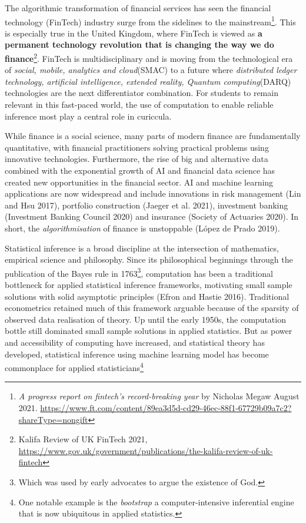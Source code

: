 \documentclass{article}
\begin{document}
The algorithmic transformation of financial services has seen the
financial technology (FinTech) industry surge from the sidelines to the
mainstream\footnote{\emph{A progress report on fintech's record-breaking
  year} by Nicholas Megaw August 2021.
  \url{https://www.ft.com/content/89ea3d5d-cd29-46ec-88f1-67729b09a7c2?shareType=nongift}}.
This is especially true in the United Kingdom, where FinTech is viewed
as \textbf{a permanent technology revolution that is changing the way we
do finance}\footnote{Kalifa Review of UK FinTech 2021,
  \url{https://www.gov.uk/government/publications/the-kalifa-review-of-uk-fintech}}.
FinTech is multidisciplinary and is moving from the technological era of
\emph{social, mobile, analytics and cloud}(SMAC) to a future where
\emph{distributed ledger technology, artificial intelligence, extended
reality, Quantum computing}(DARQ) technologies are the next
differentiator combination. For students to remain relevant in this
fast-paced world, the use of computation to enable reliable inference
most play a central role in curiccula.

While finance is a social science, many parts of modern finance are
fundamentally quantitative, with financial practitioners solving
practical problems using innovative technologies. Furthermore, the rise
of big and alternative data combined with the exponential growth of AI
and financial data science has created new opportunities in the
financial sector. AI and machine learning applications are now
widespread and include innovations in risk management (Lin and Hsu
2017), portfolio construction (Jaeger et al. 2021), investment banking
(Investment Banking Council 2020) and insurance (Society of Actuaries
2020). In short, the \emph{algorithmisation} of finance is unstoppable
(López de Prado 2019).

Statistical inference is a broad discipline at the intersection of
mathematics, empirical science and philosophy. Since its philosophical
beginnings through the publication of the Bayes rule in 1763\footnote{Which
  was used by early advocates to argue the existence of God.},
computation has been a traditional bottleneck for applied statistical
inference frameworks, motivating small sample solutions with solid
asymptotic principles (Efron and Hastie 2016). Traditional econometrics
retained much of this framework arguable because of the sparsity of
observed data realisation of theory. Up until the early 1950s, the
computation bottle still dominated small sample solutions in applied
statistics. But as power and accessibility of computing have increased,
and statistical theory has developed, statistical inference using
machine learning model has become commonplace for applied
statisticians\footnote{One notable example is the \emph{bootstrap} a
  computer-intensive inferential engine that is now ubiquitous in
  applied statistics.}
\end{document}
